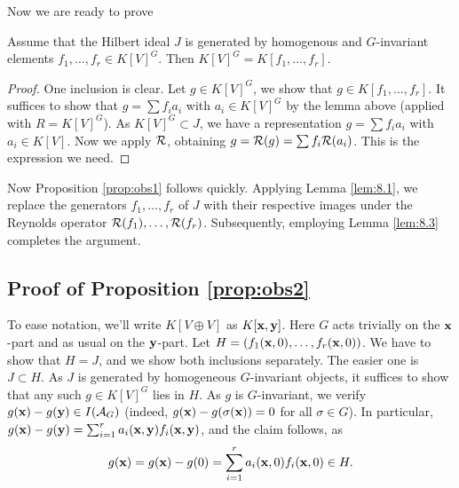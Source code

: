 \documentclass[../main.tex]{subfiles}
\begin{document}
Now we are ready to prove
\begin{lem}\label{lem:8.3}
    Assume that the Hilbert ideal $J$ is generated by homogenous and
    $G$-invariant elements $f_1, \dots, \allowbreak f_r \in K[V]^G$. Then
    $K[V]^G = K[f_1, \dots, f_r]$. 
\begin{proof}
    One inclusion is clear. Let $g \in K[V]^G$, we show that $g \in K[f_1, \dots, f_r]$.
    It suffices to show that $g = \sum f_i a_i$ with $a_i \in K[V]^G$
    by the lemma above (applied with $R = K[V]^G$). As $K[V]^G \subset J$, we
    have a representation $g = \sum f_i a_i$ with $a_i \in K[V]$. Now we apply
    $\mathcal{R}$, obtaining $g = \mathcal{R}(g) = \sum f_i \mathcal{R}(a_i)$. This is the expression
    we need.
\end{proof}
\end{lem}

Now Proposition \ref{prop:obs1} follows quickly.
Applying Lemma \ref{lem:8.1}, we replace the generators $f_1, \dots, f_r$ of
$J$ with their respective images under the Reynolds operator $\mathcal{R}(f_1), \dots,
\mathcal{R}(f_r)$. Subsequently, employing Lemma \ref{lem:8.3} completes the argument.

\subsection{Proof of Proposition \ref{prop:obs2}} %
\label{sub:Proof of proposition 9}
To ease notation, we'll write $K[V \oplus V]$ as $K[\mathbf{x},\mathbf{y}]$. Here $G$ acts trivially
on the $\mathbf{x}$-part and as usual on the $\mathbf{y}$-part.
Let $H = (f_1(\mathbf{x}, 0), \dots, f_r(\mathbf{x},0))$. We have to show that $H = J$, and
we show both inclusions separately. The easier one is $J \subset H$. 
As $J$ is generated by homogeneous $G$-invariant objects, it suffices to show that any
such $g \in K[V]^G$ lies in $H$. As $g$ is $G$-invariant, we verify $g(\mathbf{x})-g(\mathbf{y}) \in
I(\mathcal{A}_G)$ (indeed, $g(\mathbf{x})-g(\sigma(\mathbf{x})) = 0$ for all $\sigma \in G$). In particular, $g(\mathbf{x}) - g(\mathbf{y}) = \sum_{i=1}^r a_i(\mathbf{x},\mathbf{y}) f_i(\mathbf{x},\mathbf{y})$,
and the claim follows, as
\begin{equation*}
    g(\mathbf{x}) = g(\mathbf{x}) - g(0) = \sum_{i=1}^r a_i(\mathbf{x},0) f_i(\mathbf{x},0) \in H.
\end{equation*}
\end{document}
